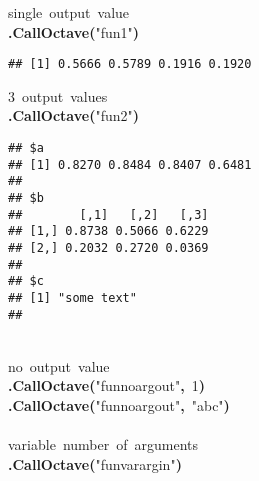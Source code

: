 \documentclass[english,10pt,a4paper]{article}\usepackage{graphicx, color}
\makeatletter
\newcommand{\hlnumber}[1]{\textcolor[rgb]{0,0,0}{#1}}%
\newcommand{\hlfunctioncall}[1]{\textcolor[rgb]{0.501960784313725,0,0.329411764705882}{\textbf{#1}}}%
\newcommand{\hlstring}[1]{\textcolor[rgb]{0.6,0.6,1}{#1}}%
\newcommand{\hlkeyword}[1]{\textcolor[rgb]{0,0,0}{\textbf{#1}}}%
\newcommand{\hlcomment}[1]{\textcolor[rgb]{0.180392156862745,0.6,0.341176470588235}{#1}}%
\newcommand{\hlstd}[1]{\textcolor[rgb]{0,0,0}{#1}}%
\newenvironment{kframe}{%
 \def\FrameCommand##1{\hskip\@totalleftmargin \hskip-\fboxsep
 \colorbox{shadecolor}{##1}\hskip-\fboxsep
     \hskip-\linewidth \hskip-\@totalleftmargin \hskip\columnwidth}%
 \MakeFramed {\advance\hsize-\width
   \@totalleftmargin\z@ \linewidth\hsize
   \@setminipage}}%
 {\par\unskip\endMakeFramed}
\newenvironment{knitrout}{}{} %
\makeatother
\begin{document}
\begin{knitrout}
\color{fgcolor}\begin{kframe}
\begin{flushleft}
\ttfamily\noindent
\hlcomment{\usebox{\hlnormalsizeboxhash}{\ }single{\ }output{\ }value}\hspace*{\fill}\\
\hlstd{}\hlfunctioncall{.CallOctave}\hlkeyword{(}\hlstring{"{}fun1"{}}\hlkeyword{)}\mbox{}
\normalfont
\end{flushleft}
\begin{verbatim}
## [1] 0.5666 0.5789 0.1916 0.1920
\end{verbatim}
\begin{flushleft}
\ttfamily\noindent
\hlcomment{\usebox{\hlnormalsizeboxhash}{\ }3{\ }output{\ }values}\hspace*{\fill}\\
\hlstd{}\hlfunctioncall{.CallOctave}\hlkeyword{(}\hlstring{"{}fun2"{}}\hlkeyword{)}\mbox{}
\normalfont
\end{flushleft}
\begin{verbatim}
## $a
## [1] 0.8270 0.8484 0.8407 0.6481
## 
## $b
##        [,1]   [,2]   [,3]
## [1,] 0.8738 0.5066 0.6229
## [2,] 0.2032 0.2720 0.0369
## 
## $c
## [1] "some text"
## 
\end{verbatim}
\begin{flushleft}
\ttfamily\noindent
\hspace*{\fill}\\
\hlstd{}\hlcomment{\usebox{\hlnormalsizeboxhash}{\ }no{\ }output{\ }value}\hspace*{\fill}\\
\hlstd{}\hlfunctioncall{.CallOctave}\hlkeyword{(}\hlstring{"{}fun\usebox{\hlnormalsizeboxunderscore}noargout"{}}\hlkeyword{,}{\ }\hlnumber{1}\hlkeyword{)}\hspace*{\fill}\\
\hlstd{}\hlfunctioncall{.CallOctave}\hlkeyword{(}\hlstring{"{}fun\usebox{\hlnormalsizeboxunderscore}noargout"{}}\hlkeyword{,}{\ }\hlstring{"{}abc"{}}\hlkeyword{)}\hspace*{\fill}\\
\hlstd{}\hspace*{\fill}\\
\hlstd{}\hlcomment{\usebox{\hlnormalsizeboxhash}{\ }variable{\ }number{\ }of{\ }arguments}\hspace*{\fill}\\
\hlstd{}\hlfunctioncall{.CallOctave}\hlkeyword{(}\hlstring{"{}fun\usebox{\hlnormalsizeboxunderscore}varargin"{}}\hlkeyword{)}\mbox{}

\end{flushleft}
\end{kframe}
\end{knitrout}
\end{document}
